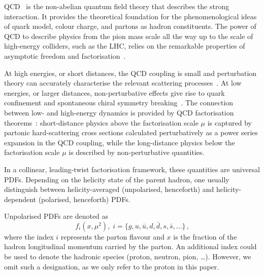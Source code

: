 QCD~\cite{Collins:2011zzd} is the non-abelian quantum field 
theory that describes the strong interaction.
%
It provides the theoretical foundation for the phenomenological ideas of 
quark model, colour charge, and partons as hadron constituents.
%
The power of QCD to describe physics from the pion mass scale all the way up 
to the scale of high-energy colliders, such as the LHC, relies on the 
remarkable properties of asymptotic freedom and 
factorisation~\cite{Gross:1973ju,Gross:1973id,Gross:1974cs,Politzer:1974fr}.

At high energies, or short distances, the QCD coupling is small 
and perturbation theory can accurately characterise the relevant scattering 
processes~\cite{Campbell:2006wx}.
%
At low energies, or larger distances, non-perturbative effects give rise to 
quark confinement and spontaneous chiral symmetry breaking~\cite{Gasser:1983yg}.
%
%
%
The connection between low- and high-energy dynamics is provided by QCD 
factorisation theorems~\cite{Collins:1989gx}: 
short-distance physics above the factorisation scale $\mu$ is captured by 
partonic hard-scattering cross sections calculated perturbatively as a 
power series expansion in the QCD coupling, while the 
long-distance physics below the factorisation scale $\mu$ is described by 
non-perturbative quantities.

In a collinear, leading-twist factorisation framework, these quantities are
universal PDFs.
%
Depending on the helicity state of the parent hadron, one usually 
distinguish between helicity-averaged (unpolarised, henceforth)
and helicity-dependent (polarised, henceforth) PDFs.

Unpolarised PDFs are denoted as 
\begin{equation}
f_{i}(x,\mu^2)\mbox{,} \ \ i=\{g,u,\bar{u},d,\bar{d},s,\bar{s},...\}
\,\mbox{,}
\label{eq:unpPDFs}
\end{equation}
where the index $i$ represents the parton flavour and $x$ is the fraction
of the hadron longitudinal momentum carried by the parton.
%
An additional index could be used to denote the hadronic species (proton,
neutron, pion, \dots).
%
However, we omit such a designation, as we only refer to the proton
in this paper.

